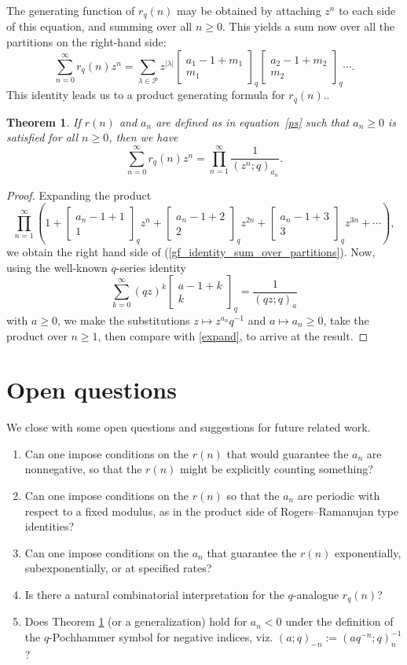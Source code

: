 \documentclass[10pt]{article}
\newtheorem{theorem}{Theorem}
\theoremstyle{definition}
\newcommand\qbin[3]{\left[ \begin{matrix} #1 \\ #2 \end{matrix}
                   \right]_{\displaystyle #3}}
\numberwithin{theorem}{section}
\numberwithin{equation}{section}
\begin{document}
The generating function of $r_q(n)$
may be obtained by attaching $z^n$ to each side of this equation, and summing over all $n \geq 0$. This yields
a sum now over  all the partitions on the right-hand side:
\begin{equation}
   \sum_{n =0}^\infty r_q(n) z^n = \sum_{\lambda\in\mathcal P} z^{\displaystyle \lvert \lambda \rvert}
   \qbin{a_1 - 1 + m_1}{m_1}{q} \qbin{a_2 - 1 + m_2}{m_2}{q} \cdots.
\label{gf_identity_sum_over_partitions}
\end{equation}
This identity leads us to a product generating formula for $r_q(n)$.. 

\begin{theorem}\label{analogue} If $r(n)$ and $a_n$ are defined as in equation~\eqref{ps} such that $a_n\geq 0$ is satisfied for all $n\geq 0$, then we have 
$$ \sum_{n =0}^\infty r_q(n) z^n = \prod_{n =1}^\infty \frac{1}{(z^n; q)_{a_n}}. $$
\end{theorem}

\begin{proof}
Expanding the product
\begin{equation}\label{expand} \prod_{n=1}^\infty \left(1 + \qbin{a_n - 1 + 1}{1}q z^n + \qbin{a_n - 1 + 2}{2}q z^{2n} + \qbin{a_n - 1 + 3}{3}q z^{3n} + \cdots \right),\end{equation}
we obtain the right hand side of (\ref{gf_identity_sum_over_partitions}). Now, using the well-known $q$-series identity
$$\sum_{k=0}^\infty (qz)^k \qbin{a - 1 + k}{k}q  = \frac{1}{(qz;q)_{a}} $$
with $a\geq 0$, we make the substitutions $z \mapsto z^{a_n}q^{-1}$ and $a \mapsto a_n\geq 0$,  take the product over $n\geq 1$, then compare with \eqref{expand}, to arrive at the result.
\end{proof}


\section{Open questions}
We close with some open questions and suggestions for future related work.
\begin{enumerate}
  \item Can one impose conditions on the $r(n)$ that would guarantee the $a_n$ are nonnegative, so that the $r(n)$ might be explicitly counting something?
 \item Can one impose conditions on the $r(n)$ so that the $a_n$ are periodic with respect to a fixed modulus, as in the product side of Rogers--Ramanujan type identities?
 \item Can one impose conditions on the $a_n$ that  guarantee the $r(n)$ exponentially, subexponentially, or at specified rates?
  \item Is there a natural combinatorial interpretation for the $q$-analogue   $r_q(n)$?
  \item Does Theorem \ref{analogue} (or a generalization) hold for $a_n<0$ under the definition of the $q$-Pochhammer symbol for negative indices, viz. $(a;q)_{-n}:=(aq^{-n};q)_n^{-1}$?  
\end{enumerate}
\end{document}
